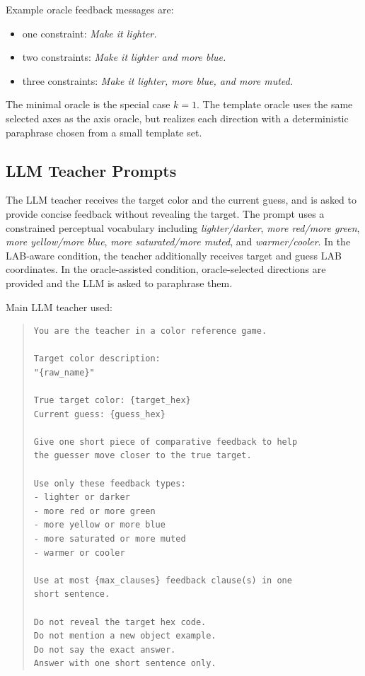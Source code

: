 \documentclass[11pt]{article}
\begin{document}
Example oracle feedback messages are:

\begin{itemize}
    \item one constraint: \textit{Make it lighter.}
    \item two constraints: \textit{Make it lighter and more blue.}
    \item three constraints: \textit{Make it lighter, more blue, and more muted.}
\end{itemize}

The minimal oracle is the special case $k=1$. The template oracle uses the
same selected axes as the axis oracle, but realizes each direction with a
deterministic paraphrase chosen from a small template set.

\subsection{LLM Teacher Prompts}
\label{ap:teacher_prompts}

The LLM teacher receives the target color and the current guess, and is
asked to provide concise feedback without revealing the target. The prompt
uses a constrained perceptual vocabulary including
\textit{lighter/darker}, \textit{more red/more green},
\textit{more yellow/more blue}, \textit{more saturated/more muted}, and
\textit{warmer/cooler}. In the LAB-aware condition, the teacher additionally
receives target and guess LAB coordinates. In the oracle-assisted condition,
oracle-selected directions are provided and the LLM is asked to paraphrase
them. 

Main LLM teacher used: 
\begin{quote}
\small
\begin{verbatim}
You are the teacher in a color reference game.

Target color description:
"{raw_name}"

True target color: {target_hex}
Current guess: {guess_hex}

Give one short piece of comparative feedback to help 
the guesser move closer to the true target.

Use only these feedback types:
- lighter or darker
- more red or more green
- more yellow or more blue
- more saturated or more muted
- warmer or cooler

Use at most {max_clauses} feedback clause(s) in one 
short sentence.

Do not reveal the target hex code.
Do not mention a new object example.
Do not say the exact answer.
Answer with one short sentence only.
\end{verbatim}
\end{quote}
\end{document}

